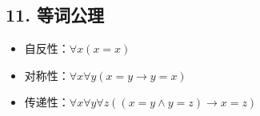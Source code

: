 \documentclass[12pt, a4paper]{article}
\begin{document}
\subsection*{11. 等词公理}
\begin{itemize}
    \item 自反性：\(\forall x (x = x)\)
    \item 对称性：\(\forall x \forall y (x = y \to y = x)\)
    \item 传递性：\(\forall x \forall y \forall z ((x = y \wedge y = z) \to x = z)\)
\end{itemize}
\end{document}
